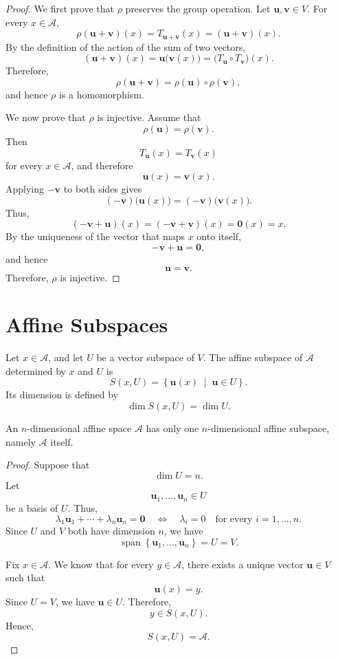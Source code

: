 \documentclass[12pt]{article}
\begin{document}
\begin{proof}
We first prove that \(\rho\) preserves the group operation. Let
\(\mathbf{u},\mathbf{v}\in V\). For every \(x\in \mathcal A\),
\[
\rho(\mathbf{u}+\mathbf{v})(x)
=
T_{\mathbf{u}+\mathbf{v}}(x)
=
(\mathbf{u}+\mathbf{v})(x).
\]
By the definition of the action of the sum of two vectors,
\[
(\mathbf{u}+\mathbf{v})(x)
=
\mathbf{u}\bigl(\mathbf{v}(x)\bigr)
=
\bigl(T_{\mathbf{u}}\circ T_{\mathbf{v}}\bigr)(x).
\]
Therefore,
\[
\rho(\mathbf{u}+\mathbf{v})
=
\rho(\mathbf{u})\circ\rho(\mathbf{v}),
\]
and hence \(\rho\) is a homomorphism.

We now prove that \(\rho\) is injective. Assume that
\[
\rho(\mathbf{u})=\rho(\mathbf{v}).
\]
Then
\[
T_{\mathbf{u}}(x)=T_{\mathbf{v}}(x)
\]
for every \(x\in \mathcal A\), and therefore
\[
\mathbf{u}(x)=\mathbf{v}(x).
\]
Applying \(-\mathbf{v}\) to both sides gives
\[
(-\mathbf{v})\bigl(\mathbf{u}(x)\bigr)
=
(-\mathbf{v})\bigl(\mathbf{v}(x)\bigr).
\]
Thus,
\[
(-\mathbf{v}+\mathbf{u})(x)
=
(-\mathbf{v}+\mathbf{v})(x)
=
\mathbf{0}(x)
=
x.
\]
By the uniqueness of the vector that maps \(x\) onto itself,
\[
-\mathbf{v}+\mathbf{u}=\mathbf{0},
\]
and hence
\[
\mathbf{u}=\mathbf{v}.
\]
Therefore, \(\rho\) is injective.
\end{proof}



\section{Affine Subspaces}

\begin{definition}
Let \(x\in \mathcal A\), and let \(U\) be a vector subspace of \(V\). The affine
subspace of \(\mathcal A\) determined by \(x\) and \(U\) is
\[
S(x,U)
=
\left\{
\mathbf{u}(x)
\;\middle|\;
\mathbf{u}\in U
\right\}.
\]
Its dimension is defined by
\[
\dim S(x,U)=\dim U.
\]
\end{definition}

\begin{proposition}
An \(n\)-dimensional affine space \(\mathcal A\) has only one \(n\)-dimensional
affine subspace, namely \(\mathcal A\) itself.
\end{proposition}

\begin{proof}
Suppose that
\[
\dim U=n.
\]
Let
\[
\mathbf{u}_1,\ldots,\mathbf{u}_n\in U
\]
be a basis of \(U\). Thus,
\[
\lambda_1\mathbf{u}_1+\cdots+\lambda_n\mathbf{u}_n=\mathbf{0}
\quad\Longleftrightarrow\quad
\lambda_i=0
\quad\text{for every }i=1,\ldots,n.
\]
Since \(U\) and \(V\) both have dimension \(n\), we have
\[
\operatorname{span}
\left\{
\mathbf{u}_1,\ldots,\mathbf{u}_n
\right\}
=
U
=
V.
\]

Fix \(x\in \mathcal A\). We know that for every \(y\in \mathcal A\), there exists a unique
vector \(\mathbf{u}\in V\) such that
\[
\mathbf{u}(x)=y.
\]
Since \(U=V\), we have \(\mathbf{u}\in U\). Therefore,
\[
y\in S(x,U).
\]
Hence,
\[
S(x,U)=\mathcal A.
\]
\end{proof}
\end{document}
